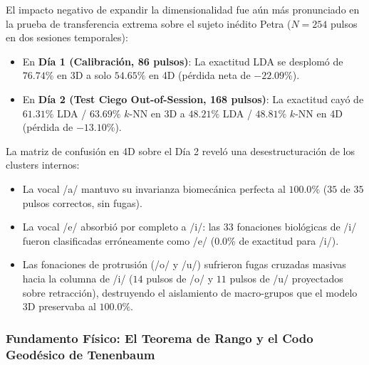 \documentclass[11pt,a4paper,openany]{book}
\theoremstyle{definition}
\begin{document}
El impacto negativo de expandir la dimensionalidad fue aún más pronunciado en la prueba de transferencia extrema sobre el sujeto inédito Petra ($N = 254$ pulsos en dos sesiones temporales):
\begin{itemize}
    \item En \textbf{Día 1 (Calibración, 86 pulsos)}: La exactitud LDA se desplomó de $\mathbf{76.74\%}$ en 3D a solo $\mathbf{54.65\%}$ en 4D (pérdida neta de $-22.09\%$).
    \item En \textbf{Día 2 (Test Ciego Out-of-Session, 168 pulsos)}: La exactitud cayó de $\mathbf{61.31\%}$ LDA / $\mathbf{63.69\%}$ $k$-NN en 3D a $\mathbf{48.21\%}$ LDA / $\mathbf{48.81\%}$ $k$-NN en 4D (pérdida de $-13.10\%$).
\end{itemize}

La matriz de confusión en 4D sobre el Día 2 reveló una desestructuración de los clusters internos:
\begin{itemize}
    \item La vocal /a/ mantuvo su invarianza biomecánica perfecta al $\mathbf{100.0\%}$ ($35$ de $35$ pulsos correctos, sin fugas).
    \item La vocal /e/ absorbió por completo a /i/: las $33$ fonaciones biológicas de /i/ fueron clasificadas erróneamente como /e/ ($0.0\%$ de exactitud para /i/).
    \item Las fonaciones de protrusión (/o/ y /u/) sufrieron fugas cruzadas masivas hacia la columna de /i/ ($14$ pulsos de /o/ y $11$ pulsos de /u/ proyectados sobre retracción), destruyendo el aislamiento de macro-grupos que el modelo 3D preservaba al $100.0\%$.
\end{itemize}

\subsubsection{Fundamento Físico: El Teorema de Rango y el Codo Geodésico de Tenenbaum}
\end{document}

